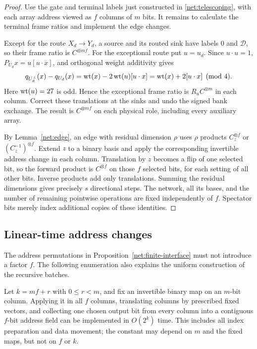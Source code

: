 \begin{proof}
Use the gate and terminal labels just constructed in
\eqref{net:telescoping}, with each array address viewed as $f$ columns
of $m$ bits.  It remains to calculate the terminal frame ratios and
implement the edge changes.

Except for the route $X_d\to Y_d$, a source and its routed sink
have labels $0$ and $\mathcal D$, so their frame ratio is
$C^{\otimes mf}$.  For the exceptional route put $u=u_d$.
Since $u\cdot u=1$, $P_{U_d}x=u[u\cdot x]$, and orthogonal
weight additivity gives
\[
 q_{U_d^\perp}(x)-q_{U_d}(x)
 =\operatorname{wt}(x)-2\operatorname{wt}(u)[u\cdot x]
 =\operatorname{wt}(x)+2[u\cdot x]\pmod4.
\]
Here $\operatorname{wt}(u)=27$ is odd.  Hence the exceptional frame ratio is
$R_uC^{\otimes m}$ in each column.  Correct these translations
at the sinks and undo the signed bank exchange.  The result is
$C^{\otimes mf}$ on each physical role, including every
auxiliary array.

By Lemma~\ref{net:edge}, an edge with residual dimension $\rho$
uses $\rho$ products $C_z^{\otimes f}$ or
$(C_z^{-1})^{\otimes f}$.  Extend $z$ to a binary basis and apply
the corresponding invertible address change in each column.
Translation by $z$ becomes a flip of one selected bit, so the
forward product is $C^{\otimes f}$ on those $f$ selected bits,
for each setting of all other bits.  Inverse products add only
translations.  Summing the residual dimensions gives precisely
$s$ directional steps.  The network, all its bases, and the
number of remaining pointwise operations are fixed independently
of $f$.  Spectator bits merely index additional copies of these
identities.
\end{proof}

\subsection{Linear-time address changes}

The address permutations in Proposition~\ref{net:finite-interface}
must not introduce a factor $f$.  The following enumeration also
explains the uniform construction of the recursive batches.

\begin{lemma}\label{net:indexing}
Let $k=mf+r$ with $0\le r<m$, and fix an invertible binary map
on an $m$-bit column.  Applying it in all $f$ columns, translating
columns by prescribed fixed vectors, and collecting one chosen
output bit from every column into a contiguous $f$-bit address
field can be implemented in $O(2^k)$ time.  This includes all
index preparation and data movement; the constant may depend on
$m$ and the fixed maps, but not on $f$ or $k$.
\end{lemma}

